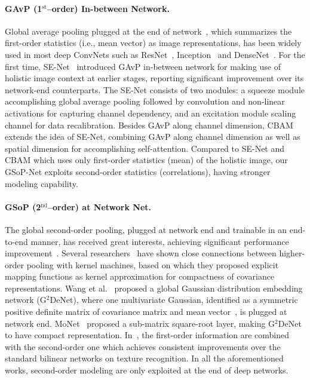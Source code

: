 \documentclass[10pt,twocolumn,letterpaper]{article}
\begin{document}
\paragraph{GAvP (1$^{\mathrm{st}}$--order) In-between Network. }  Global average pooling plugged at the end of network~\cite{Lin_ICLR_2014_GFoP}, which summarizes the first-order statistics (i.e., mean vector) as image representations,  has been widely used in most deep ConvNets such as ResNet~\cite{He_2016_CVPR}, Inception~\cite{Szegedy_2015_CVPR} and DenseNet~\cite{Huang_2017_CVPR}. For the first time, SE-Net~\cite{Hu_2018_CVPR_SE} introduced GAvP in-between network for making use of holistic image context at earlier stages, reporting significant  improvement over its network-end counterparts. The SE-Net  consists of two modules: a squeeze module accomplishing  global average pooling followed by convolution and non-linear activations for  capturing  channel dependency, and an excitation module scaling channel for data recalibration.  Besides GAvP along channel dimension, CBAM~\cite{Woo_2018_ECCV} extends  the idea of SE-Net, combining  GAvP along channel dimension as well as spatial dimension for accomplishing  self-attention.   Compared to SE-Net and CBAM which uses only first-order statistics (mean) of the holistic  image, our GSoP-Net exploits second-order statistics (correlations), having stronger modeling capability.




\paragraph{GSoP (2$^{\mathrm{nd}}$--order) at Network Net.}

The global second-order pooling, plugged at network end and trainable in an end-to-end manner, has received great interests, achieving significant  performance improvement~\cite{Cui_2017_CVPR,Li_2017_ICCV,Li_2018_CVPR}. Several researchers~\cite{Gao_2016_CVPR,Cui_2017_CVPR,Cai_2017_ICCV} have shown close connections between higher-order pooling with kernel machines, based on which they proposed explicit  mapping functions as kernel approximation  for compactness of covariance representations. Wang et al.~\cite{Wang_2017_CVPR} proposed a global Gaussian distribution embedding network (G$^2$DeNet), where one multivariate Gaussian, identified as a symmetric positive definite matrix of covariance matrix and mean vector~\cite{LE2MG}, is plugged at network end. MoNet~\cite{Xiao_2018_CVPR} proposed a sub-matrix square-root layer, making G$^2$DeNet to have compact representation. In~\cite{Dai_2017_CVPR}, the first-order information are combined with the second-order one which achieves consistent  improvements over the standard bilinear  networks on texture recognition.  In all the aforementioned works, second-order modeling are only exploited at the end of deep networks. 
\end{document}
